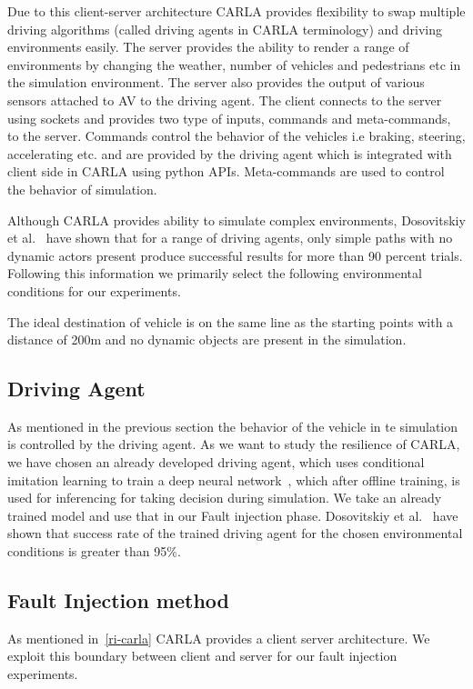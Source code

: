 \bigskip

Due to this client-server architecture CARLA provides flexibility to swap multiple driving algorithms (called driving agents in CARLA terminology) and driving environments easily. The server provides the ability to render a range of environments by changing the weather, number of vehicles and pedestrians etc in the simulation environment. The server also provides the output of various sensors attached to AV to the driving agent. The client connects to the server using sockets and provides two type of inputs, commands and meta-commands, to the server. Commands control the behavior of the vehicles i.e braking, steering, accelerating etc. and are provided by the driving agent which is integrated with client side in CARLA using python APIs. Meta-commands are used to control the behavior of simulation.

Although CARLA provides ability to simulate complex environments, Dosovitskiy et al.~\cite{Dosovitskiy17} have shown that for a range of driving agents, only simple paths with no dynamic actors present produce successful results for more than 90 percent trials. Following this information we primarily select the following environmental conditions for our experiments. 

The ideal destination of vehicle is on the same line as the starting points with a distance of 200m and no dynamic objects are present in the simulation.

\subsection{Driving Agent}
As mentioned in the previous section the behavior of the vehicle in te simulation is controlled by the driving agent. As we want to study the resilience of CARLA, we have chosen an already developed driving agent, which uses conditional imitation learning to train a deep neural network~\cite{Codevilla2018}, which after offline training, is used for inferencing for taking decision during simulation. We take an already trained model and use that in our Fault injection phase. Dosovitskiy et al.~\cite{Dosovitskiy17} have shown that success rate of the trained driving agent for the chosen environmental conditions is greater than 95\%.

\subsection{Fault Injection method} \label{method}
As mentioned in~\ref{ri-carla} CARLA provides a client server architecture. We exploit this boundary between client and server for our fault injection experiments. 

